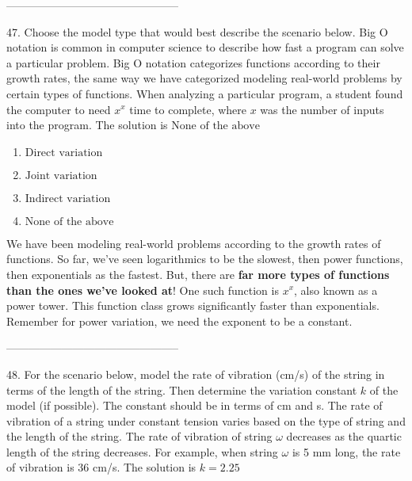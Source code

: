 \documentclass{extbook}[14pt]
\begin{document}
-----------------------------------------------

47. Choose the model type that would best describe the scenario below.
Big O notation is common in computer science to describe how fast a program can solve a particular problem. Big O notation categorizes functions according to their growth rates, the same way we have categorized modeling real-world problems by certain types of functions. When analyzing a particular program, a student found the computer to need $x^x$ time to complete, where $x$ was the number of inputs into the program. 
The solution is $ \text{None of the above} $ 

\begin{enumerate}[label=\Alph*.] 
\item $ \text{Direct variation} $ 

  
\item $ \text{Joint variation} $ 

  
\item $ \text{Indirect variation} $ 

  
\item $ \text{None of the above} $ 

  
\end{enumerate} 
 
We have been modeling real-world problems according to the growth rates of functions. So far, we've seen logarithmics to be the slowest, then power functions, then exponentials as the fastest. But, there are \textbf{far more types of functions than the ones we've looked at}! One such function is $x^x$, also known as a power tower. This function class grows significantly faster than exponentials. Remember for power variation, we need the exponent to be a constant.

-----------------------------------------------

48. For the scenario below, model the rate of vibration (cm/s) of the string in terms of the length of the string. Then determine the variation constant $k$ of the model (if possible). The constant should be in terms of cm and s.
The rate of vibration of a string under constant tension varies based on the type of string and the length of the string. The rate of vibration of string $\omega$ decreases as the quartic length of the string decreases. For example, when string $\omega$ is 5 mm long, the rate of vibration is 36 cm/s. 
The solution is $ k = 2.25 $ 
\end{document}
